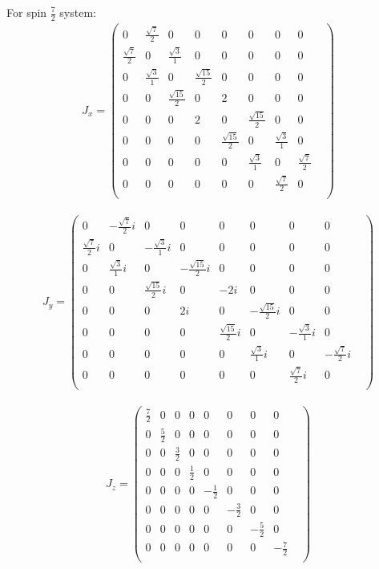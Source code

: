 \documentclass[10pt,a4paper]{article}
\begin{document}
For spin $\frac{7}{2}$ system:\begin{align}
J_x = \begin{pmatrix}
0&\frac{\sqrt{7}}{2}&0&0&0&0&0&0&\\\frac{\sqrt{7}}{2}&0&\frac{\sqrt{3}}{1}&0&0&0&0&0&\\0&\frac{\sqrt{3}}{1}&0&\frac{\sqrt{15}}{2}&0&0&0&0&\\0&0&\frac{\sqrt{15}}{2}&0&2&0&0&0&\\0&0&0&2&0&\frac{\sqrt{15}}{2}&0&0&\\0&0&0&0&\frac{\sqrt{15}}{2}&0&\frac{\sqrt{3}}{1}&0&\\0&0&0&0&0&\frac{\sqrt{3}}{1}&0&\frac{\sqrt{7}}{2}&\\0&0&0&0&0&0&\frac{\sqrt{7}}{2}&0&\\\end{pmatrix}\end{align}

\begin{align}
J_y = \begin{pmatrix}
0&-\frac{\sqrt{7}}{2}i&0&0&0&0&0&0&\\\frac{\sqrt{7}}{2}i&0&-\frac{\sqrt{3}}{1}i&0&0&0&0&0&\\0&\frac{\sqrt{3}}{1}i&0&-\frac{\sqrt{15}}{2}i&0&0&0&0&\\0&0&\frac{\sqrt{15}}{2}i&0&-2i&0&0&0&\\0&0&0&2i&0&-\frac{\sqrt{15}}{2}i&0&0&\\0&0&0&0&\frac{\sqrt{15}}{2}i&0&-\frac{\sqrt{3}}{1}i&0&\\0&0&0&0&0&\frac{\sqrt{3}}{1}i&0&-\frac{\sqrt{7}}{2}i&\\0&0&0&0&0&0&\frac{\sqrt{7}}{2}i&0&\\\end{pmatrix}\end{align}

\begin{align}
J_z = \begin{pmatrix}
\frac{7}{2}&0&0&0&0&0&0&0&\\0&\frac{5}{2}&0&0&0&0&0&0&\\0&0&\frac{3}{2}&0&0&0&0&0&\\0&0&0&\frac{1}{2}&0&0&0&0&\\0&0&0&0&-\frac{1}{2}&0&0&0&\\0&0&0&0&0&-\frac{3}{2}&0&0&\\0&0&0&0&0&0&-\frac{5}{2}&0&\\0&0&0&0&0&0&0&-\frac{7}{2}&\\\end{pmatrix}\end{align}
\end{document}
